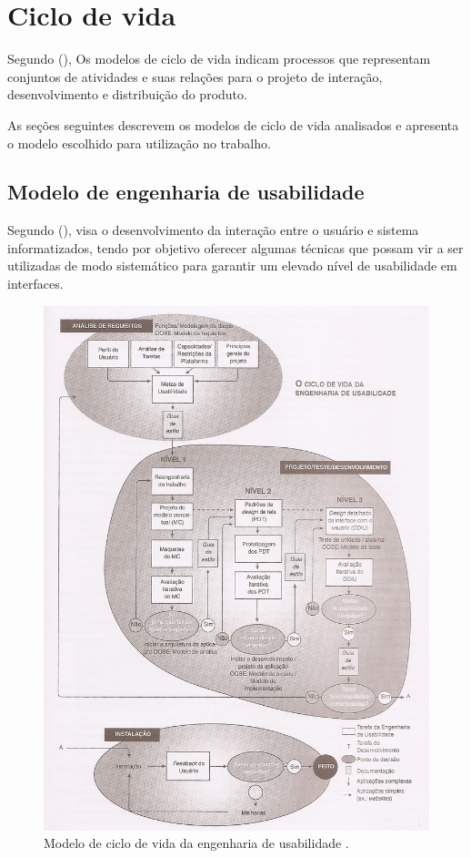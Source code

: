 \chapter{Ciclo de vida}

  Segundo \citeauthor{ihc} (\citeyear{ihc}), Os modelos de ciclo de vida indicam processos que representam conjuntos
  de atividades e suas relações para o projeto de interação, desenvolvimento e distribuição do produto.
  
  As seções seguintes descrevem os modelos de ciclo de vida analisados e apresenta o modelo escolhido para utilização no trabalho.

  \section{Modelo de engenharia de usabilidade}
  
  Segundo \citeauthor{engusabilidade} (\citeyear{engusabilidade}), visa o desenvolvimento da interação entre o usuário e
  sistema informatizados, tendo por objetivo oferecer algumas técnicas 
  que possam vir a ser utilizadas de modo sistemático para garantir um elevado nível de usabilidade em interfaces. 
  
  \begin{figure}[!htb]
  \centering
  \includegraphics[scale=0.55, angle=90]{figuras/ciclovidaengusabilidade.jpg}
  \caption[Modelo de ciclo de vida da engenharia de usabilidade]{Modelo de ciclo de vida da engenharia de usabilidade \cite{ciclovidaengdeusabilidade}.}
  \end{figure}
  
